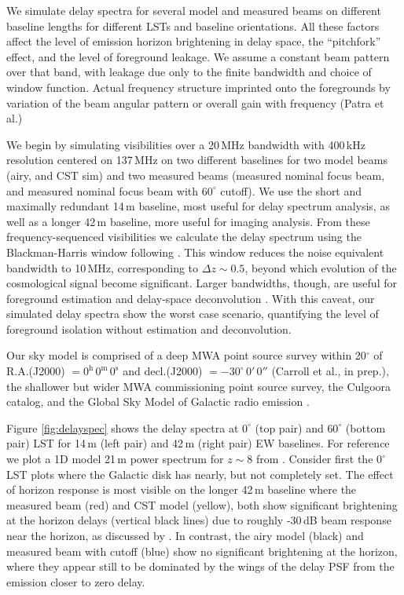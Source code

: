 \documentclass{emulateapj}
\begin{document}
We simulate delay spectra for several model and measured beams on different baseline lengths for different LSTs and baseline orientations. All these factors affect the level of emission horizon brightening in delay space, the ``pitchfork'' effect, and the level of foreground leakage. We assume a constant beam pattern over that band, with leakage due only to the finite bandwidth and choice of window function. Actual frequency structure imprinted onto the foregrounds by variation of the beam angular pattern or overall gain with frequency (Patra et al.)

We begin by simulating visibilities over a 20\,MHz bandwidth with  400\,kHz resolution centered on 137\,MHz on two different baselines for two model beams (airy, and CST sim) and two measured beams (measured nominal focus beam, and measured nominal focus beam with $60^\circ$ cutoff). We use the short and maximally redundant 14\,m baseline, most useful for delay spectrum analysis, as well as a longer 42\,m baseline, more useful for imaging analysis. From these frequency-sequenced visibilities we calculate the delay spectrum  \citep{perbaselinetechnique} using the Blackman-Harris window following \citet{nithya15}. This window reduces the noise equivalent bandwidth to 10\,MHz, corresponding to $\Delta z\sim0.5$, beyond which evolution of the cosmological signal become significant. Larger bandwidths, though, are useful for foreground estimation and delay-space deconvolution \citep{parsonsandbacker,paper32,paper64}. With this caveat, our simulated delay spectra show the worst case scenario, quantifying the level of foreground isolation without estimation and deconvolution.

Our sky model is comprised of a deep MWA point source survey within 20$^\circ$ of R.A.(J2000) $= 0^\text{h}\,0^\text{m}\,0^\text{s}$ and decl.(J2000) $= -30^\circ\,0'\,0''$ (Carroll et al., in prep.), the shallower but wider MWA commissioning point source survey\citep{MWACS}, the Culgoora catalog\citep{Slee1995}, and the Global Sky Model of Galactic radio emission \citep{gsm}. 

Figure \ref{fig:delayspec} shows the delay spectra at $0^\circ$ (top pair) and $60^\circ$ (bottom pair) LST for 14\,m (left pair) and 42\,m (right pair) EW baselines. For reference we plot a 1D model 21\,m power spectrum for $z\sim8$ from \citet{21cmfast}. Consider first the $0^\circ$ LST plots where the Galactic disk has nearly, but not completely set. The effect of horizon response is most visible on the longer 42\,m baseline where the measured beam (red) and CST model (yellow), both show significant brightening at the horizon delays (vertical black lines) due to roughly -30\,dB beam response near the horizon, as discussed by \citet{nithya15,nithya15}. In contrast, the airy model (black) and measured beam with cutoff (blue) show no significant brightening at the horizon, where they appear still to be dominated by the wings of the delay PSF from the emission closer to zero delay. 
\end{document}

